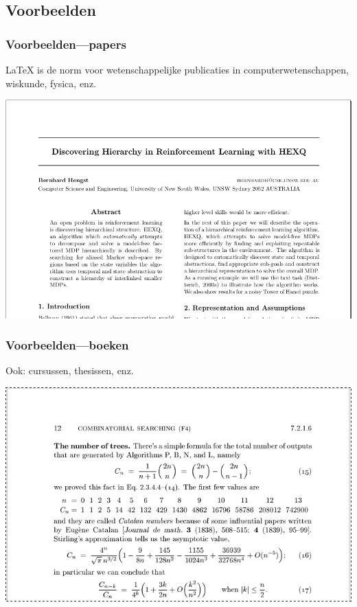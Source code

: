 \documentclass[aspectratio=169]{beamer}
\begin{document}
\begin{frame}
\begin{columns}[c]
  \end{columns}
\end{frame}

\subsection{Voorbeelden}

\begin{frame}
  \frametitle{Voorbeelden---papers}

  {\LaTeX} is de norm voor wetenschappelijke publicaties in computerwetenschappen, wiskunde, fysica, enz.

  \begin{center}
  \includegraphics[height=.6\textheight]{img/oef1-03}
  \end{center}

\end{frame}

\begin{frame}
  \frametitle{Voorbeelden---boeken}

  Ook: cursussen, thesissen, enz.

  \begin{center}
	\includegraphics[height=.6\textheight]{img/oef1-04}
  \end{center}

\end{frame}
\end{document}
